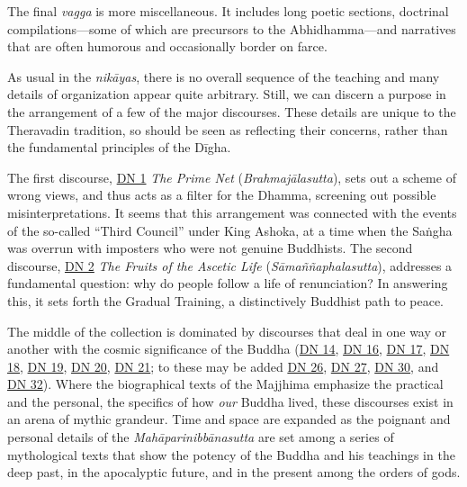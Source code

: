\documentclass[12pt,openany]{book}%
\begin{document}
The final \textit{vagga} is more miscellaneous. It includes long poetic sections, doctrinal compilations—some of which are precursors to the Abhidhamma—and narratives that are often humorous and occasionally border on farce.

As usual in the \textit{\textsanskrit{nikāyas}}, there is no overall sequence of the teaching and many details of organization appear quite arbitrary. Still, we can discern a purpose in the arrangement of a few of the major discourses. These details are unique to the Theravadin tradition, so should be seen as reflecting their concerns, rather than the fundamental principles of the \textsanskrit{Dīgha}.

The first discourse, \href{https://suttacentral.net/dn1}{DN 1} \textit{The Prime Net} (\textit{\textsanskrit{Brahmajālasutta}}), sets out a scheme of wrong views, and thus acts as a filter for the Dhamma, screening out possible misinterpretations. It seems that this arrangement was connected with the events of the so-called “Third Council” under King Ashoka, at a time when the \textsanskrit{Saṅgha} was overrun with imposters who were not genuine Buddhists. The second discourse, \href{https://suttacentral.net/dn2}{DN 2} \textit{The Fruits of the Ascetic Life} (\textit{\textsanskrit{Sāmaññaphalasutta}}), addresses a fundamental question: why do people follow a life of renunciation? In answering this, it sets forth the Gradual Training, a distinctively Buddhist path to peace.

The middle of the collection is dominated by discourses that deal in one way or another with the cosmic significance of the Buddha (\href{https://suttacentral.net/dn14}{DN 14}, \href{https://suttacentral.net/dn16}{DN 16}, \href{https://suttacentral.net/dn17}{DN 17}, \href{https://suttacentral.net/dn18}{DN 18}, \href{https://suttacentral.net/dn19}{DN 19}, \href{https://suttacentral.net/dn20}{DN 20}, \href{https://suttacentral.net/dn21}{DN 21}; to these may be added \href{https://suttacentral.net/dn26}{DN 26}, \href{https://suttacentral.net/dn27}{DN 27}, \href{https://suttacentral.net/dn30}{DN 30}, and \href{https://suttacentral.net/dn32}{DN 32}). Where the biographical texts of the Majjhima emphasize the practical and the personal, the specifics of how \emph{our} Buddha lived, these discourses exist in an arena of mythic grandeur. Time and space are expanded as the poignant and personal details of the \textit{\textsanskrit{Mahāparinibbānasutta}} are set among a series of mythological texts that show the potency of the Buddha and his teachings in the deep past, in the apocalyptic future, and in the present among the orders of gods.
\end{document}
